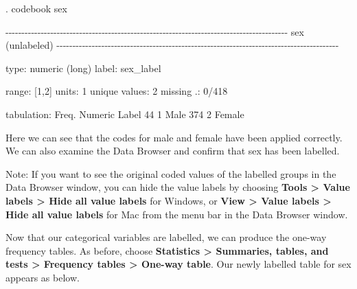 \documentclass[
  a4paper,
]{memoir}
\newenvironment{Shaded}{\begin{snugshade}}{\end{snugshade}}
\newcommand{\DecValTok}[1]{\textcolor[rgb]{0.00,0.00,0.00}{#1}}
\newcommand{\FunctionTok}[1]{\textcolor[rgb]{0.00,0.00,0.00}{#1}}
\newcommand{\NormalTok}[1]{\textcolor[rgb]{0.00,0.00,0.00}{#1}}
\newcommand{\SpecialCharTok}[1]{\textcolor[rgb]{0.00,0.00,0.00}{#1}}
\begin{document}
\begin{Shaded}
\begin{Highlighting}[]
\NormalTok{. codebook sex}

\SpecialCharTok{{-}{-}{-}{-}{-}{-}{-}{-}{-}{-}{-}{-}{-}{-}{-}{-}{-}{-}{-}{-}{-}{-}{-}{-}{-}{-}{-}{-}{-}{-}{-}{-}{-}{-}{-}{-}{-}{-}{-}{-}{-}{-}{-}{-}{-}{-}{-}{-}{-}{-}{-}{-}{-}{-}{-}{-}{-}{-}{-}{-}{-}{-}{-}{-}{-}{-}{-}{-}{-}{-}{-}{-}{-}{-}{-}{-}{-}{-}{-}{-}{-}{-}{-}{-}{-}{-}{-}{-}}
\FunctionTok{sex}\NormalTok{                                                                          (unlabeled)}
\SpecialCharTok{{-}{-}{-}{-}{-}{-}{-}{-}{-}{-}{-}{-}{-}{-}{-}{-}{-}{-}{-}{-}{-}{-}{-}{-}{-}{-}{-}{-}{-}{-}{-}{-}{-}{-}{-}{-}{-}{-}{-}{-}{-}{-}{-}{-}{-}{-}{-}{-}{-}{-}{-}{-}{-}{-}{-}{-}{-}{-}{-}{-}{-}{-}{-}{-}{-}{-}{-}{-}{-}{-}{-}{-}{-}{-}{-}{-}{-}{-}{-}{-}{-}{-}{-}{-}{-}{-}{-}{-}}

\NormalTok{                  type}\SpecialCharTok{:}  \FunctionTok{numeric}\NormalTok{ (long)}
\NormalTok{                 label}\SpecialCharTok{:}\NormalTok{  sex\_label}

\NormalTok{                 range}\SpecialCharTok{:}\NormalTok{  [}\DecValTok{1}\NormalTok{,}\DecValTok{2}\NormalTok{]                        units}\SpecialCharTok{:}  \DecValTok{1}
\NormalTok{         unique values}\SpecialCharTok{:}  \DecValTok{2}\NormalTok{                        missing .}\SpecialCharTok{:}  \DecValTok{0}\SpecialCharTok{/}\DecValTok{418}

\NormalTok{            tabulation}\SpecialCharTok{:}\NormalTok{  Freq.   Numeric  Label}
                            \DecValTok{44}         \DecValTok{1}\NormalTok{  Male}
                           \DecValTok{374}         \DecValTok{2}\NormalTok{  Female}
\end{Highlighting}
\end{Shaded}

Here we can see that the codes for male and female have been applied
correctly. We can also examine the Data Browser and confirm that sex has
been labelled.

Note: If you want to see the original coded values of the labelled
groups in the Data Browser window, you can hide the value labels by
choosing \textbf{Tools \textgreater{} Value labels \textgreater{} Hide
all value labels} for Windows, or \textbf{View \textgreater{} Value
labels \textgreater{} Hide all value labels} for Mac from the menu bar
in the Data Browser window.

Now that our categorical variables are labelled, we can produce the
one-way frequency tables. As before, choose \textbf{Statistics
\textgreater{} Summaries, tables, and tests \textgreater{} Frequency
tables \textgreater{} One-way table}. Our newly labelled table for sex
appears as below.
\end{document}
